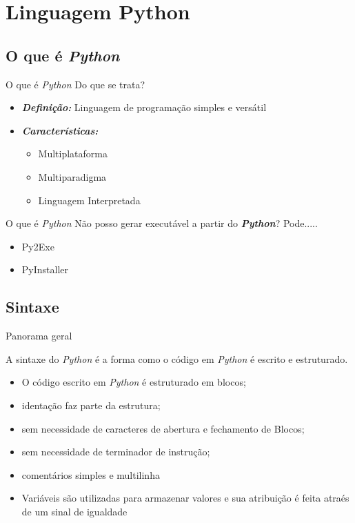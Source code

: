 \documentclass{beamer}
\begin{document}
\section{Linguagem Python}

\subsection{O que é \textit{Python}}


\begin{frame}{O que é \textit{Python}}
	Do que se trata?
	\begin{itemize}
		\item \textbf{\textit{Definição:}} Linguagem de programação simples e versátil
		\item \textbf{\textit{Características:}}
		\begin{itemize}
			\item Multiplataforma
			\item Multiparadigma
			\item Linguagem Interpretada
		\end{itemize}
	\end{itemize}
\end{frame}

\begin{frame}{O que é \textit{Python}}
	Não posso gerar executável a partir do \textbf{\textit{Python}}? Pode.....
	\begin{itemize}
		\item Py2Exe
		\item PyInstaller
	\end{itemize}
\end{frame}

\subsection{Sintaxe}

\begin{frame}{Panorama geral}
	
	A sintaxe do \textit{Python} é a forma como o código em \textit{Python} é escrito e
    estruturado. 
    
    \begin{itemize}
    	\item O código escrito em \textit{Python} é estruturado em blocos;
    	\item identação faz parte da estrutura;
    	\item sem necessidade de caracteres de abertura e fechamento de Blocos;
    	\item sem necessidade de terminador de instrução;
    	\item comentários simples e multilinha
    	\item Variáveis são utilizadas para armazenar valores e sua atribuição é feita atraés de um sinal de igualdade
    \end{itemize}
	
\end{frame}
\end{document}
